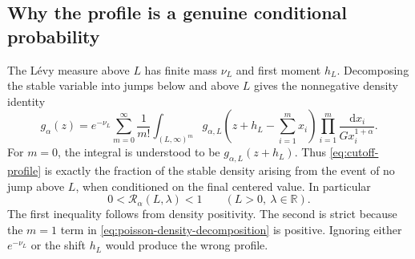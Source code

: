 \documentclass[11pt,a4paper]{article}
\numberwithin{equation}{section}
\theoremstyle{definition}
\theoremstyle{remark}
\newcommand{\R}{\mathbb R}
\newcommand{\dd}{\,\mathrm d}
\newcommand{\Ra}{\mathcal R_\alpha}
\begin{document}
\subsection{Why the profile is a genuine conditional probability}
The L\'evy measure above $L$ has finite mass $\nu_L$ and first moment
$h_L$. Decomposing the stable variable into jumps below and above $L$
gives the nonnegative density identity
\begin{equation}\label{eq:poisson-density-decomposition}
 g_\alpha(z)=e^{-\nu_L}\sum_{m=0}^\infty\frac1{m!}
   \int_{(L,\infty)^m}
      g_{\alpha,L}\left(z+h_L-\sum_{i=1}^m x_i\right)
      \prod_{i=1}^m\frac{\dd x_i}{Gx_i^{1+\alpha}}.
\end{equation}
For $m=0$, the integral is understood to be $g_{\alpha,L}(z+h_L)$.
Thus \eqref{eq:cutoff-profile} is exactly the fraction of the stable
density arising from the event of no jump above $L$, when conditioned on
the final centered value. In particular
\begin{equation}\label{eq:profile-range}
 0<\Ra(L,\lambda)<1\qquad(L>0,\ \lambda\in\R).
\end{equation}
The first inequality follows from density positivity. The second is
strict because the $m=1$ term in \eqref{eq:poisson-density-decomposition}
is positive. Ignoring either $e^{-\nu_L}$ or the shift $h_L$ would
produce the wrong profile.
\end{document}
